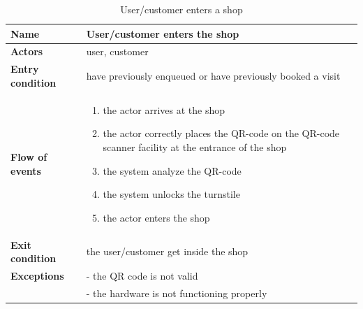 \begin{table}[h!]
    \centering
    \begin{tabular}{@{}P{0.2\textwidth}P{0.70\textwidth}@{}}
        \toprule
        \textbf{Name}                 & User/customer enters the shop\\
        \midrule
        \textbf{Actors}               & user, customer\\
        \textbf{Entry condition}      & have previously enqueued or have previously booked a visit\\
        \textbf{Flow of events}       & 
        \begin{enumerate}[nolistsep, leftmargin=*]
            \item the actor arrives at the shop
            \item the actor correctly places the QR-code on the QR-code scanner facility at the entrance of the shop
            \item the system analyze the QR-code
            \item the system unlocks the turnstile
            \item the actor enters the shop
        \end{enumerate} \\
        \textbf{Exit condition}       & the user/customer get inside the shop\\
        \textbf{Exceptions}           
        & - the QR code is not valid\\
        & - the hardware is not functioning properly\\
        \bottomrule
    \end{tabular}
\caption{User/customer enters a shop}
\label{table:entershop}
\end{table}

